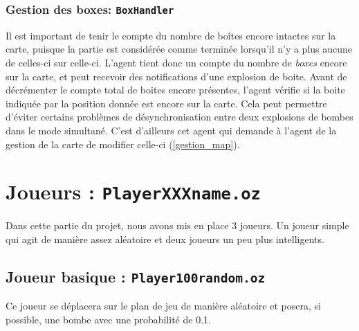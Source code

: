 \documentclass{article}
\begin{document}
\subsubsection{Gestion des boxes: \texttt{BoxHandler}}
\label{gestion_boxes}
Il est important de tenir le compte du nombre de boîtes encore intactes sur la carte, puisque la partie est considérée comme terminée lorsqu'il n'y a plus aucune de celles-ci sur celle-ci. L'agent tient donc un compte du nombre de \emph{boxes} encore sur la carte, et peut recevoir des notifications d'une explosion de boite. Avant de décrémenter le compte total de boites encore présentes, l'agent vérifie si la boite indiquée par la position donnée est encore sur la carte. Cela peut permettre d'éviter certains problèmes de désynchronisation entre deux explosions de bombes dans le mode simultané. C'est d'ailleurs cet agent qui demande à l'agent de la gestion de la carte de modifier celle-ci (\ref{gestion_map}).

\section{Joueurs : \texttt{PlayerXXXname.oz}}
Dans cette partie du projet, nous avons mis en place 3 joueurs. Un joueur simple qui agit de manière assez aléatoire et deux joueurs un peu plus intelligents.
\subsection{Joueur basique : \texttt{Player100random.oz}}
Ce joueur se déplacera sur le plan de jeu de manière aléatoire et posera, si possible, une bombe avec une probabilité de 0.1.
\end{document}
